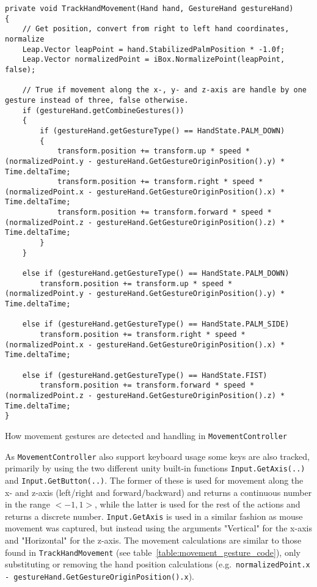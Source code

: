 \begin{table}
\label{table:movement_gesture_code}
\lstset{style=csharp}
\begin{lstlisting}
private void TrackHandMovement(Hand hand, GestureHand gestureHand)
{
    // Get position, convert from right to left hand coordinates, normalize
    Leap.Vector leapPoint = hand.StabilizedPalmPosition * -1.0f;
    Leap.Vector normalizedPoint = iBox.NormalizePoint(leapPoint, false);

    // True if movement along the x-, y- and z-axis are handle by one gesture instead of three, false otherwise.
    if (gestureHand.getCombineGestures()) 
    {
        if (gestureHand.getGestureType() == HandState.PALM_DOWN)
        {
            transform.position += transform.up * speed * (normalizedPoint.y - gestureHand.GetGestureOriginPosition().y) * Time.deltaTime;
            transform.position += transform.right * speed * (normalizedPoint.x - gestureHand.GetGestureOriginPosition().x) * Time.deltaTime;
            transform.position += transform.forward * speed * (normalizedPoint.z - gestureHand.GetGestureOriginPosition().z) * Time.deltaTime;
        }      
    }

    else if (gestureHand.getGestureType() == HandState.PALM_DOWN)
        transform.position += transform.up * speed * (normalizedPoint.y - gestureHand.GetGestureOriginPosition().y) * Time.deltaTime;

    else if (gestureHand.getGestureType() == HandState.PALM_SIDE)
        transform.position += transform.right * speed * (normalizedPoint.x - gestureHand.GetGestureOriginPosition().x) * Time.deltaTime;

    else if (gestureHand.getGestureType() == HandState.FIST)
        transform.position += transform.forward * speed * (normalizedPoint.z - gestureHand.GetGestureOriginPosition().z) * Time.deltaTime;
}                                                                              
\end{lstlisting}
\caption[How movement gestures are detected and handling in \texttt{MovementController}]{How movement gestures are detected and handling in \texttt{MovementController}} 
\end{table}

As \texttt{Movement\-Controller} also support keyboard usage some keys are also tracked, primarily by using the two different unity built-in functions \texttt{Input.\-GetAxis(..)} 
and \texttt{Input.\-GetButton(..)}. The former of these is used for movement along the x- and z-axis (left/right and forward/backward) and returns a continuous number in the 
range $<-1, 1>$, while the latter is used for the rest of the actions and returns a discrete number. 
\texttt{Input.GetAxis} is used in a similar fashion as mouse movement was captured, but instead using the arguments "Vertical" for the x-axis and "Horizontal" for the z-axis. 
The movement calculations are similar to those found in \texttt{TrackHandMovement} (see table~\vref{table:movement_gesture_code}), only substituting or removing the
hand position calculations (e.g.~\texttt{normalizedPoint.x - gestureHand.GetGestureOriginPosition().x}). 

